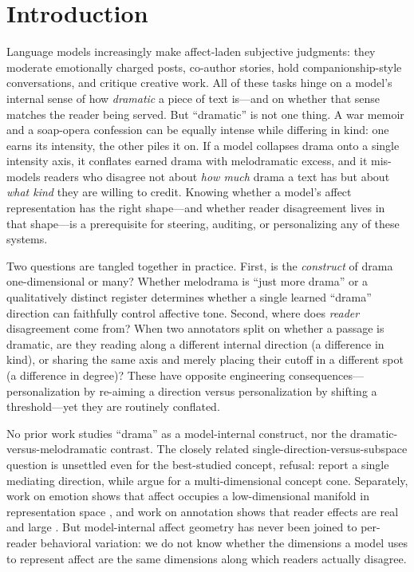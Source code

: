 \section{Introduction}\label{sec:intro}

Language models increasingly make affect-laden subjective judgments: they moderate emotionally charged posts, co-author stories, hold companionship-style conversations, and critique creative work. All of these tasks hinge on a model's internal sense of how \emph{dramatic} a piece of text is---and on whether that sense matches the reader being served. But ``dramatic'' is not one thing. A war memoir and a soap-opera confession can be equally intense while differing in kind: one earns its intensity, the other piles it on. If a model collapses drama onto a single intensity axis, it conflates earned drama with melodramatic excess, and it mis-models readers who disagree not about \emph{how much} drama a text has but about \emph{what kind} they are willing to credit. Knowing whether a model's affect representation has the right shape---and whether reader disagreement lives in that shape---is a prerequisite for steering, auditing, or personalizing any of these systems.

 Two questions are tangled together in practice. First, is the \emph{construct} of drama one-dimensional or many? Whether melodrama is ``just more drama'' or a qualitatively distinct register determines whether a single learned ``drama'' direction can faithfully control affective tone. Second, where does \emph{reader} disagreement come from? When two annotators split on whether a passage is dramatic, are they reading along a different internal direction (a difference in kind), or sharing the same axis and merely placing their cutoff in a different spot (a difference in degree)? These have opposite engineering consequences---personalization by re-aiming a direction versus personalization by shifting a threshold---yet they are routinely conflated.

 No prior work studies ``drama'' as a model-internal construct, nor the dramatic-versus-melodramatic contrast. The closely related single-direction-versus-subspace question is unsettled even for the best-studied concept, refusal: \citet{arditi2024refusal} report a single mediating direction, while \citet{wollschlager2025geometry} argue for a multi-dimensional concept cone. Separately, work on emotion shows that affect occupies a low-dimensional manifold in representation space \citep{reichman2025emotions}, and work on annotation shows that reader effects are real and large \citep{orlikowski2025beyond,zhou2025subjectivity}. But model-internal affect geometry has never been joined to per-reader behavioral variation: we do not know whether the dimensions a model uses to represent affect are the same dimensions along which readers actually disagree.

